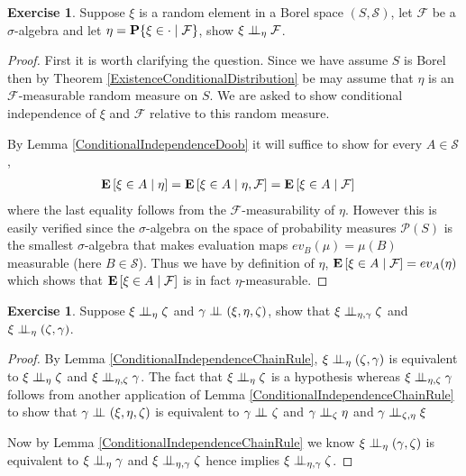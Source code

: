 \documentclass{amsart}
\theoremstyle{remark}
\theoremstyle{definition}
\newtheorem{ex}[thm]{Exercise}
\begin{document}
\begin{ex}Suppose $\xi$ is a random element in a Borel space $(S, \mathcal{S})$, let
  $\mathcal{F}$ be a $\sigma$-algebra and let $\eta =
  \cprobability{\mathcal{F}}{\xi \in \cdot}$, show $\cindependent{\xi}{\mathcal{F}}{\eta}$.
\end{ex}
\begin{proof}
First it is worth clarifying the question.  Since we have assume $S$
is Borel then by Theorem \ref{ExistenceConditionalDistribution} be may
assume that $\eta$ is an $\mathcal{F}$-measurable random measure on
$S$.  We are asked to show conditional independence of $\xi$ and
$\mathcal{F}$ relative to this random measure.

By Lemma \ref{ConditionalIndependenceDoob} it will suffice to show for
every $A \in \mathcal{S}$, 
\begin{align*}
\cexpectationlong{\eta}{\xi \in  A} 
&= \cexpectationlong{\eta,\mathcal{F}}{\xi \in  A} 
= \cexpectationlong{\mathcal{F}}{\xi \in  A} 
\end{align*}
where the last equality follows from the $\mathcal{F}$-measurability
of $\eta$.  However this is easily verified since the $\sigma$-algebra
on the space of probability measures $\mathcal{P}(S)$ is the smallest $\sigma$-algebra that makes
evaluation maps $ev_B(\mu) = \mu(B)$ measurable (here $B \in \mathcal{S}$).  Thus we have by
definition of $\eta$, $\cexpectationlong{\mathcal{F}}{\xi \in  A} =
ev_A(\eta)$ which shows that $\cexpectationlong{\mathcal{F}}{\xi \in
  A}$ is in fact $\eta$-measurable.
\end{proof}

\begin{ex}Suppose $\cindependent{\xi}{\zeta}{\eta}$ and
  $\cindependent{\gamma}{(\xi,\eta, \zeta)}{}$, show that
  $\cindependent{\xi}{\zeta}{\eta,\gamma}$ and $\cindependent{\xi}{(\zeta,\gamma)}{\eta}$.
\end{ex}
\begin{proof}
By Lemma \ref{ConditionalIndependenceChainRule},
$\cindependent{\xi}{(\zeta,\gamma)}{\eta}$ is equivalent to
$\cindependent{\xi}{\zeta}{\eta}$ and
$\cindependent{\xi}{\gamma}{\eta, \zeta}$.  The fact that
$\cindependent{\xi}{\zeta}{\eta}$ is a hypothesis whereas
$\cindependent{\xi}{\gamma}{\eta, \zeta}$ follows from another
application of Lemma \ref{ConditionalIndependenceChainRule} to show
that $\cindependent{\gamma}{(\xi,\eta, \zeta)}{}$ is equivalent to
$\cindependent{\gamma}{\zeta}{}$ and
$\cindependent{\gamma}{\eta}{\zeta}$ and
$\cindependent{\gamma}{\xi}{\zeta, \eta}$

Now by Lemma \ref{ConditionalIndependenceChainRule} 
we know $\cindependent{\xi}{(\gamma, \zeta)}{\eta}$ is equivalent to
$\cindependent{\xi}{\gamma}{\eta}$ and
$\cindependent{\xi}{\zeta}{\eta, \gamma}$
hence implies $\cindependent{\xi}{\zeta}{\eta, \gamma}$.
\end{proof}
\end{document}

